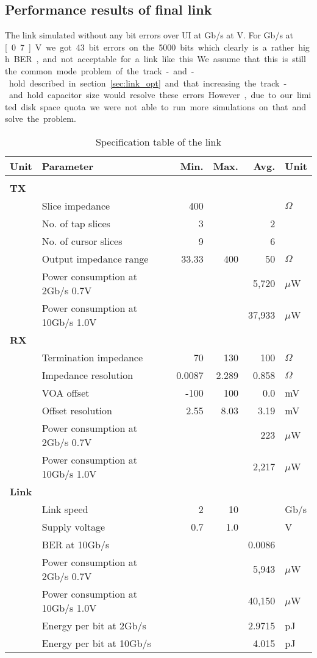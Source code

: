 \subsection{Performance results of final link}

The link simulated without any bit errors over \unit[5000]{UI} at \unit[2]{Gb/s} at \unit[1]{V}. For \unit[10]{Gb/s} at \unit[0.7]{V} we got 43 bit errors on the 5000 bits which clearly is a rather high BER, and not acceptable for a link like this. We assume that this is still the common mode problem of the track-and-hold described in section \ref{sec:link_opt} and that increasing the track-and.hold capacitor size would resolve these errors. However, due to our limited disk space quota we were not able to run more simulations on that and solve the problem.



\begin{table}[H]
  \centering
  \begin{tabular}{l l|r|r|r|l}
 Unit  & Parameter & Min. & Max. & Avg. & Unit \\
    \hline
    & & & & &\\
\textbf{TX} & & & & &\\
&	Slice impedance & 400 &  &  & $\Omega$\\
&	No. of tap slices & 3 &  & 2 & \\
&	No. of cursor slices & 9 &  & 6 & \\
&	Output impedance range & 33.33 & 400 & 50 & $\Omega$\\
&	Power consumption at 2Gb/s 0.7V &  &  & 5,720 & $\mu$W\\
&	Power consumption at 10Gb/s 1.0V &  &  & 37,933 & $\mu$W\\

\textbf{RX} & & & & &\\
&	Termination impedance & 70 & 130 & 100 & $\Omega$\\
&	Impedance resolution & 0.0087 & 2.289 & 0.858 & $\Omega$\\
&	VOA offset & -100 & 100 & 0.0 & mV\\
&	Offset resolution & 2.55 & 8.03 & 3.19 & mV\\
&	Power consumption at 2Gb/s 0.7V &  &  & 223  & $\mu$W\\
&	Power consumption at 10Gb/s 1.0V &&  &  2,217  & $\mu$W\\

\textbf{Link} & & & & &\\
&	Link speed & 2 & 10 &  & Gb/s \\
&	Supply voltage  & 0.7 & 1.0 &  & V\\
&	BER at 10Gb/s  &  &  & 0.0086 & \\
&	Power consumption at 2Gb/s 0.7V &  &  & 5,943 & $\mu$W\\
&	Power consumption at 10Gb/s 1.0V &  &  & 40,150 & $\mu$W\\
&   Energy per bit at 2Gb/s &  & & 2.9715 & pJ \\
&   Energy per bit at 10Gb/s &  & & 4.015 & pJ \\
  \end{tabular}
  \caption{Specification table of the link}
  \label{tab:specifications}
\end{table}